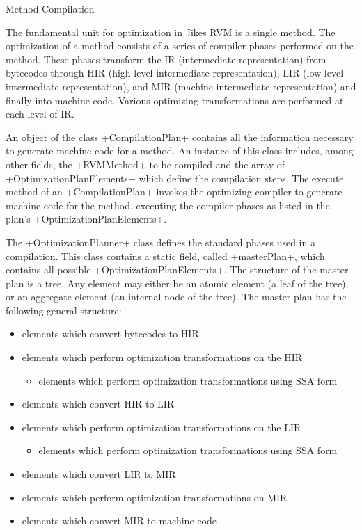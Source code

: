 \begin{section}{Method Compilation}
\label{sec:methodcompilation}

The fundamental unit for optimization in Jikes RVM is a single method. The optimization of a method consists of a series of compiler phases performed on the method. These phases transform the IR (intermediate representation) from bytecodes through HIR (high-level intermediate representation), LIR (low-level intermediate representation), and MIR (machine intermediate representation) and finally into machine code. Various optimizing transformations are performed at each level of IR.

An object of the class \spverb+CompilationPlan+ contains all the information necessary to generate machine code for a method. An instance of this class includes, among other fields, the \spverb+RVMMethod+ to be compiled and the array of \spverb+OptimizationPlanElements+ which define the compilation steps. The execute method of an \spverb+CompilationPlan+ invokes the optimizing compiler to generate machine code for the method, executing the compiler phases as listed in the plan's \spverb+OptimizationPlanElements+.

The \spverb+OptimizationPlanner+ class defines the standard phases used in a compilation. This class contains a static field, called \spverb+masterPlan+, which contains all possible \spverb+OptimizationPlanElements+. The structure of the master plan is a tree. Any element may either be an atomic element (a leaf of the tree), or an aggregate element (an internal node of the tree). The master plan has the following general structure:
\begin{itemize}
  \item elements which convert bytecodes to HIR
  \item elements which perform optimization transformations on the HIR
    \begin{itemize}
      \item elements which perform optimization transformations using SSA form
    \end{itemize}
  \item elements which convert HIR to LIR
  \item elements which perform optimization transformations on the LIR
    \begin{itemize}
      \item elements which perform optimization transformations using SSA form
    \end{itemize}
  \item elements which convert LIR to MIR
  \item elements which perform optimization transformations on MIR
  \item elements which convert MIR to machine code
\end{itemize}


\end{section}
